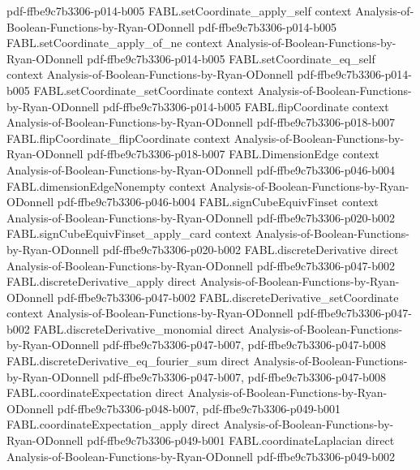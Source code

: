 \begin{theorem}
  {pdf-ffbe9c7b3306-p014-b005}
\proofstep
  {FABL.setCoordinate_apply_self}
  {context}
  {Analysis-of-Boolean-Functions-by-Ryan-ODonnell}
  {pdf-ffbe9c7b3306-p014-b005}
\proofstep
  {FABL.setCoordinate_apply_of_ne}
  {context}
  {Analysis-of-Boolean-Functions-by-Ryan-ODonnell}
  {pdf-ffbe9c7b3306-p014-b005}
\proofstep
  {FABL.setCoordinate_eq_self}
  {context}
  {Analysis-of-Boolean-Functions-by-Ryan-ODonnell}
  {pdf-ffbe9c7b3306-p014-b005}
\proofstep
  {FABL.setCoordinate_setCoordinate}
  {context}
  {Analysis-of-Boolean-Functions-by-Ryan-ODonnell}
  {pdf-ffbe9c7b3306-p014-b005}
\proofstep
  {FABL.flipCoordinate}
  {context}
  {Analysis-of-Boolean-Functions-by-Ryan-ODonnell}
  {pdf-ffbe9c7b3306-p018-b007}
\proofstep
  {FABL.flipCoordinate_flipCoordinate}
  {context}
  {Analysis-of-Boolean-Functions-by-Ryan-ODonnell}
  {pdf-ffbe9c7b3306-p018-b007}
\proofstep
  {FABL.DimensionEdge}
  {context}
  {Analysis-of-Boolean-Functions-by-Ryan-ODonnell}
  {pdf-ffbe9c7b3306-p046-b004}
\proofstep
  {FABL.dimensionEdgeNonempty}
  {context}
  {Analysis-of-Boolean-Functions-by-Ryan-ODonnell}
  {pdf-ffbe9c7b3306-p046-b004}
\proofstep
  {FABL.signCubeEquivFinset}
  {context}
  {Analysis-of-Boolean-Functions-by-Ryan-ODonnell}
  {pdf-ffbe9c7b3306-p020-b002}
\proofstep
  {FABL.signCubeEquivFinset_apply_card}
  {context}
  {Analysis-of-Boolean-Functions-by-Ryan-ODonnell}
  {pdf-ffbe9c7b3306-p020-b002}
\proofstep
  {FABL.discreteDerivative}
  {direct}
  {Analysis-of-Boolean-Functions-by-Ryan-ODonnell}
  {pdf-ffbe9c7b3306-p047-b002}
\proofstep
  {FABL.discreteDerivative_apply}
  {direct}
  {Analysis-of-Boolean-Functions-by-Ryan-ODonnell}
  {pdf-ffbe9c7b3306-p047-b002}
\proofstep
  {FABL.discreteDerivative_setCoordinate}
  {context}
  {Analysis-of-Boolean-Functions-by-Ryan-ODonnell}
  {pdf-ffbe9c7b3306-p047-b002}
\proofstep
  {FABL.discreteDerivative_monomial}
  {direct}
  {Analysis-of-Boolean-Functions-by-Ryan-ODonnell}
  {pdf-ffbe9c7b3306-p047-b007,
    pdf-ffbe9c7b3306-p047-b008}
\proofstep
  {FABL.discreteDerivative_eq_fourier_sum}
  {direct}
  {Analysis-of-Boolean-Functions-by-Ryan-ODonnell}
  {pdf-ffbe9c7b3306-p047-b007,
    pdf-ffbe9c7b3306-p047-b008}
\proofstep
  {FABL.coordinateExpectation}
  {direct}
  {Analysis-of-Boolean-Functions-by-Ryan-ODonnell}
  {pdf-ffbe9c7b3306-p048-b007,
    pdf-ffbe9c7b3306-p049-b001}
\proofstep
  {FABL.coordinateExpectation_apply}
  {direct}
  {Analysis-of-Boolean-Functions-by-Ryan-ODonnell}
  {pdf-ffbe9c7b3306-p049-b001}
\proofstep
  {FABL.coordinateLaplacian}
  {direct}
  {Analysis-of-Boolean-Functions-by-Ryan-ODonnell}
  {pdf-ffbe9c7b3306-p049-b002}

\end{theorem}
